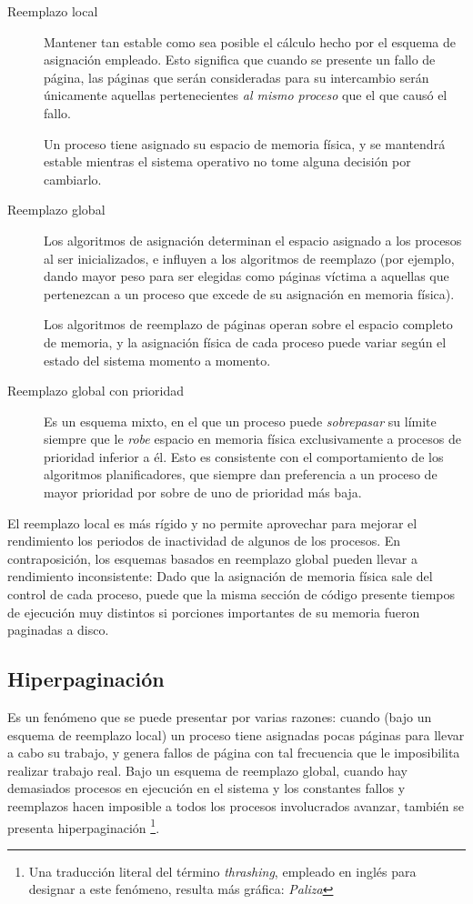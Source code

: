 \documentclass[11pt,fleqn]{book} %
\begin{document}
\begin{description}
\item[Reemplazo local] Mantener tan estable como sea posible el
     cálculo hecho por el esquema de asignación empleado.
     Esto significa que cuando se presente un fallo de
     página, las páginas que serán consideradas para su intercambio
     serán únicamente aquellas pertenecientes \emph{al mismo proceso} que
     el que causó el fallo.

     Un proceso tiene asignado su espacio de memoria física, y se
     mantendrá estable mientras el sistema operativo no tome alguna
     decisión por cambiarlo.
\item[Reemplazo global] Los algoritmos de asignación determinan el
     espacio asignado a los procesos al ser inicializados, e influyen
     a los algoritmos de reemplazo (por ejemplo, dando mayor peso para
     ser elegidas como páginas víctima a aquellas que pertenezcan a un
     proceso que excede de su asignación en memoria física).

     Los algoritmos de reemplazo de páginas operan sobre el espacio
     completo de memoria, y la asignación física de cada proceso puede
     variar según el estado del sistema momento a momento.
\item[Reemplazo global con prioridad] Es un esquema mixto, en el que un
     proceso puede \emph{sobrepasar} su límite siempre que le \emph{robe}
     espacio en memoria física exclusivamente a procesos de prioridad
     inferior a él. Esto es consistente con el comportamiento de los
     algoritmos planificadores, que siempre dan preferencia a un
     proceso de mayor prioridad por sobre de uno de prioridad más
     baja.
\end{description}

El reemplazo local es más rígido y no permite aprovechar para mejorar
el rendimiento los periodos de inactividad de algunos de los
procesos. En contraposición, los esquemas basados en reemplazo global
pueden llevar a rendimiento inconsistente: Dado que la asignación de
memoria física sale del control de cada proceso, puede que la misma
sección de código presente tiempos de ejecución muy distintos si
porciones importantes de su memoria fueron paginadas a disco.
\subsection{Hiperpaginación}
\label{sec-5-5-5}


Es un fenómeno que se puede presentar por varias razones: cuando (bajo 
un esquema de reemplazo local) un proceso tiene asignadas
 pocas páginas para llevar a cabo su trabajo, y genera fallos
de página con tal frecuencia que le imposibilita realizar trabajo
real. Bajo un esquema de reemplazo global, cuando hay demasiados procesos
en ejecución en el sistema y los constantes fallos y reemplazos hacen
imposible a todos los procesos involucrados avanzar, también  se 
presenta hiperpaginación \footnote{Una traducción literal del
término \emph{thrashing}, empleado en inglés para designar a este fenómeno,
resulta más gráfica: \emph{Paliza} }.
\end{document}

